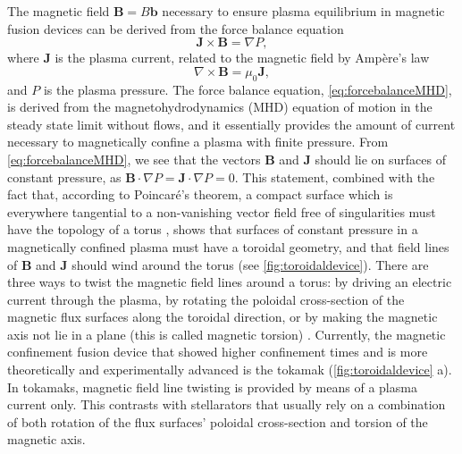 The magnetic field $\mathbf B=B \mathbf b$ necessary to ensure plasma equilibrium in magnetic fusion devices can be derived from the force balance equation \citep{Freidberg2007}
%
\begin{equation}
    \mathbf J \times \mathbf B = \nabla P,
\label{eq:forcebalanceMHD}
\end{equation}
%
where $\mathbf J$ is the plasma current, related to the magnetic field by Ampère's law
%
\begin{equation}
    \nabla \times \mathbf B = \mu_0 \mathbf J,
\end{equation}
%
and $P$ is the plasma pressure.
%
The force balance equation, \cref{eq:forcebalanceMHD}, is derived from the magnetohydrodynamics (MHD) equation of motion in the steady state limit without flows, and it essentially provides the amount of current necessary to magnetically confine a plasma with finite pressure.
%
From \cref{eq:forcebalanceMHD}, we see that the vectors $\mathbf B$ and $\mathbf J$ should lie on surfaces of constant pressure, as $\mathbf B \cdot \nabla P = \mathbf J \cdot \nabla P = 0$.
%
This statement, combined with the fact that, according to Poincaré's theorem, a compact surface which is everywhere tangential to a non-vanishing vector field free of singularities must have the topology of a torus \citep{Helander2014}, shows that surfaces of constant pressure in a magnetically confined plasma must have a toroidal geometry, and that field lines of $\mathbf B$ and $\mathbf J$ should wind around the torus (see \cref{fig:toroidaldevice}).
%
There are three ways to twist the magnetic field lines around a torus: by driving an electric current through the plasma, by rotating the poloidal cross-section of the magnetic flux surfaces along the toroidal direction, or by making the magnetic axis not lie in a plane (this is called magnetic torsion) \citep{Mercier1964,Helander2014}.
%
Currently, the magnetic confinement fusion device that showed higher confinement times and is more theoretically and experimentally  advanced is the tokamak (\cref{fig:toroidaldevice} a).
%
In tokamaks, magnetic field line twisting is provided by means of a plasma current only.
%
This contrasts with stellarators that usually rely on a combination of both rotation of the flux surfaces' poloidal cross-section and torsion of the magnetic axis.

